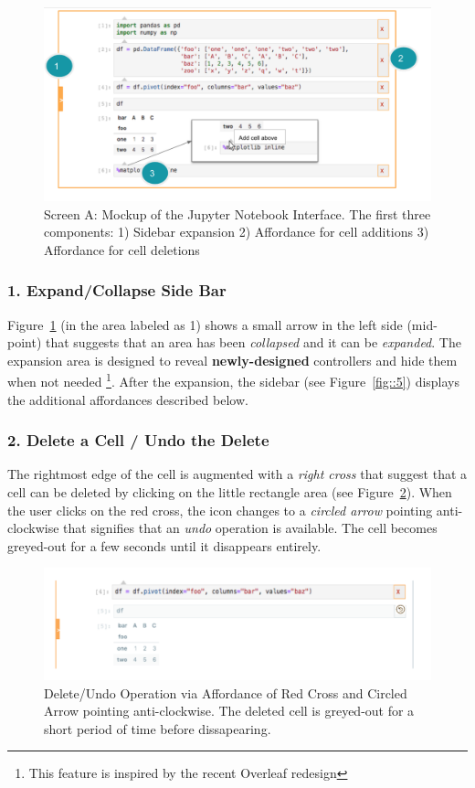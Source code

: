 \documentclass[12pt,letterpaper]{article}
\begin{document}
\begin{figure}[hbt!]
\centering
\includegraphics[scale=.5]{figures/project-principles/jupyter_mock_screen_a.png}
\caption{Screen A: Mockup of the Jupyter Notebook Interface. The first three components: 1) Sidebar expansion 2) Affordance for cell additions 3) Affordance for cell deletions}
\label{fig::4}
\end{figure}

\subsubsection*{1. Expand/Collapse Side Bar}
Figure~\ref{fig::4} (in the area labeled as 1) shows a small arrow in the left side (mid-point) that suggests that an area has been \textit{collapsed} and it can be \textit{expanded}. The expansion area is designed to reveal \textbf{newly-designed} controllers and hide them when not needed \footnote{This feature is inspired by the recent Overleaf redesign}. After the expansion, the sidebar (see Figure~\ref{fig::5}) displays the additional affordances described below.

\subsubsection*{2. Delete a Cell / Undo the Delete}
The rightmost edge of the cell is augmented with a \textit{right cross}  that suggest that a cell can be deleted by clicking on the little rectangle area (see Figure~\ref{fig::undo}). When the user clicks on the red cross, the icon changes to a \textit{circled arrow} pointing anti-clockwise that signifies that an \textit{undo} operation is available. The cell becomes greyed-out for a few seconds until it disappears entirely.

\begin{figure}[hbt!]
\centering
\includegraphics[scale=.5]{figures/project-principles/delete_undo.png}
\caption{Delete/Undo Operation via Affordance of Red Cross and Circled Arrow pointing anti-clockwise. The deleted cell is greyed-out for a short period of time before dissapearing.}
\label{fig::undo}
\end{figure}
\end{document}
